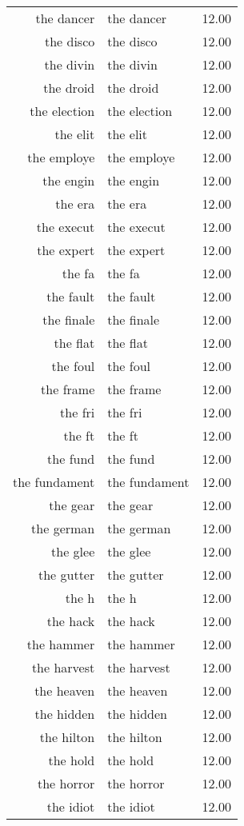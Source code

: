 \begin{table}[ht]
\begin{tabular}{rlr}
  the dancer & the dancer & 12.00 \\ 
  the disco & the disco & 12.00 \\ 
  the divin & the divin & 12.00 \\ 
  the droid & the droid & 12.00 \\ 
  the election & the election & 12.00 \\ 
  the elit & the elit & 12.00 \\ 
  the employe & the employe & 12.00 \\ 
  the engin & the engin & 12.00 \\ 
  the era & the era & 12.00 \\ 
  the execut & the execut & 12.00 \\ 
  the expert & the expert & 12.00 \\ 
  the fa & the fa & 12.00 \\ 
  the fault & the fault & 12.00 \\ 
  the finale & the finale & 12.00 \\ 
  the flat & the flat & 12.00 \\ 
  the foul & the foul & 12.00 \\ 
  the frame & the frame & 12.00 \\ 
  the fri & the fri & 12.00 \\ 
  the ft & the ft & 12.00 \\ 
  the fund & the fund & 12.00 \\ 
  the fundament & the fundament & 12.00 \\ 
  the gear & the gear & 12.00 \\ 
  the german & the german & 12.00 \\ 
  the glee & the glee & 12.00 \\ 
  the gutter & the gutter & 12.00 \\ 
  the h & the h & 12.00 \\ 
  the hack & the hack & 12.00 \\ 
  the hammer & the hammer & 12.00 \\ 
  the harvest & the harvest & 12.00 \\ 
  the heaven & the heaven & 12.00 \\ 
  the hidden & the hidden & 12.00 \\ 
  the hilton & the hilton & 12.00 \\ 
  the hold & the hold & 12.00 \\ 
  the horror & the horror & 12.00 \\ 
  the idiot & the idiot & 12.00 \\ 

\end{tabular}
\end{table}
